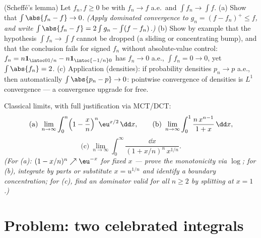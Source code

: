 \begin{exercise}[$\star\star$]\label{exo:b3:lebesgue:11}
(Scheff\'e's lemma) Let $f_n, f \geq 0$ be  with
$f_n \to f$ a.e.\ and $\int f_n \to \int f$.
(a) Show that $\int\abs{f_n - f} \to 0$. \emph{(Apply
dominated convergence to $g_n = (f - f_n)^+ \leq f$, and
write $\int\abs{f_n - f} = 2\int g_n - \int(f - f_n)$.)}
(b) Show by example that the hypothesis $\int f_n \to \int
f$ cannot be dropped (a sliding or concentrating bump), and
that the conclusion fails for signed $f_n$ without
absolute-value control: $f_n = n\mathbf 1_{\intoc0{1/n}} -
n\mathbf 1_{\intoc{-1/n}0}$ has $f_n \to 0$ a.e., $\int f_n
= 0 \to 0$, yet $\int\abs{f_n} = 2$.
(c) Application (densities): if probability densities $p_n
\to p$ a.e., then automatically $\int\abs{p_n - p} \to 0$:
pointwise convergence of densities is $L^1$ convergence ---
a convergence upgrade for free.
\end{exercise}

\begin{exercise}[$\star\star$]\label{exo:b3:lebesgue:12}
Classical limits, with full justification via MCT/DCT:
\[
\text{(a)}\ \lim_{n\to\infty}\int_0^n\Bigl(1 -
\frac xn\Bigr)^n\eu^{x/2}\,\dd x, \qquad
\text{(b)}\ \lim_{n\to\infty}\int_0^1\frac{n\,x^{n-1}}{1 +
x}\,\dd x,
\]
\[
\text{(c)}\ \lim_{n\to\infty}\int_0^\infty
\frac{\dd x}{(1 + x/n)^n\,x^{1/n}} .
\]
\emph{(For (a): $(1 - x/n)^n \nearrow \eu^{-x}$ for fixed
$x$ --- prove the monotonicity via $\log$; for (b),
integrate by parts or substitute $x = u^{1/n}$ and identify
a boundary concentration; for (c), find an 
dominator valid for all $n \geq 2$ by splitting at $x =
1$.)}
\end{exercise}

\section{Problem: two celebrated integrals}

